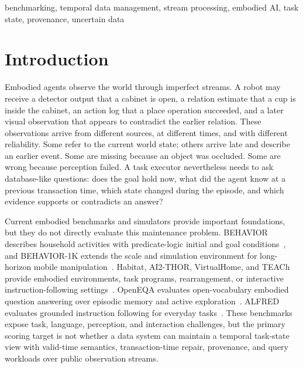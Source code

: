 \documentclass[conference]{IEEEtran}
\begin{document}
\begin{IEEEkeywords}
benchmarking, temporal data management, stream processing, embodied AI, task state, provenance, uncertain data
\end{IEEEkeywords}

\section{Introduction}

Embodied agents observe the world through imperfect streams. A robot may receive a detector output that a cabinet is open, a relation estimate that a cup is inside the cabinet, an action log that a place operation succeeded, and a later visual observation that appears to contradict the earlier relation. These observations arrive from different sources, at different times, and with different reliability. Some refer to the current world state; others arrive late and describe an earlier event. Some are missing because an object was occluded. Some are wrong because perception failed. A task executor nevertheless needs to ask database-like questions: does the goal hold now, what did the agent know at a previous transaction time, which state changed during the episode, and which evidence supports or contradicts an answer?

Current embodied benchmarks and simulators provide important foundations, but they do not directly evaluate this maintenance problem. BEHAVIOR describes household activities with predicate-logic initial and goal conditions~\cite{srivastava2022behavior}, and BEHAVIOR-1K extends the scale and simulation environment for long-horizon mobile manipulation~\cite{li2024behavior1k}. Habitat, AI2-THOR, VirtualHome, and TEACh provide embodied environments, task programs, rearrangement, or interactive instruction-following settings~\cite{savva2019habitat,szot2021habitat,kolve2017ai2thor,puig2018virtualhome,padmakumar2022teach}. OpenEQA evaluates open-vocabulary embodied question answering over episodic memory and active exploration~\cite{majumdar2024openeqa}. ALFRED evaluates grounded instruction following for everyday tasks~\cite{shridhar2020alfred}. These benchmarks expose task, language, perception, and interaction challenges, but the primary scoring target is not whether a data system can maintain a temporal task-state view with valid-time semantics, transaction-time repair, provenance, and query workloads over public observation streams.
\end{document}
